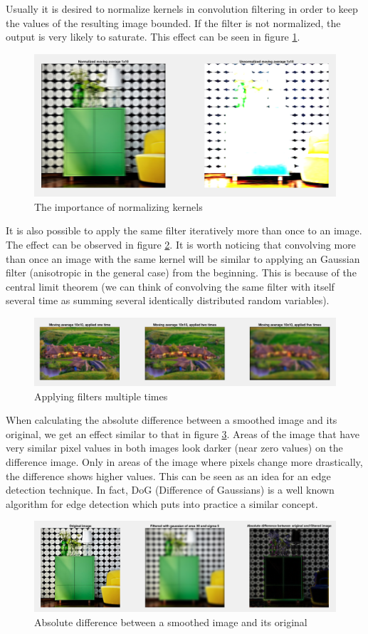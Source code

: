 Usually it is desired to normalize kernels in convolution filtering in order to keep the values of the resulting image bounded. If the filter is not normalized, the output is very likely to saturate. This effect can be seen in figure \ref{fig:task15}.

\begin{figure}[!hbt]
  \includegraphics[width=\textwidth]{./img/task15.png}
  \caption{The importance of normalizing kernels}
  \label{fig:task15}
\end{figure}

It is also possible to apply the same filter iteratively more than once to an image. The effect can be observed in figure \ref{fig:task16}. It is worth noticing that convolving more than once an image with the same kernel will be similar to applying an Gaussian filter (anisotropic in the general case) from the beginning. This is because of the central limit theorem (we can think of convolving the same filter with itself several time as summing several identically distributed random variables).

\begin{figure}[!hbt]
  \includegraphics[width=\textwidth]{./img/task16.png}
  \caption{Applying filters multiple times}
  \label{fig:task16}
\end{figure}

When calculating the absolute difference between a smoothed image and its original, we get an effect similar to that in figure \ref{fig:task17}. Areas of the image that have very similar pixel values in both images look darker (near zero values) on the difference image. Only in areas of the image where pixels change more drastically, the difference shows higher values. This can be seen as an idea for an edge detection technique. In fact, DoG (Difference of Gaussians) is a well known algorithm for edge detection which puts into practice a similar concept.

\begin{figure}[!hbt]
  \includegraphics[width=\textwidth]{./img/task17.png}
  \caption{Absolute difference between a smoothed image and its original}
  \label{fig:task17}
\end{figure}
